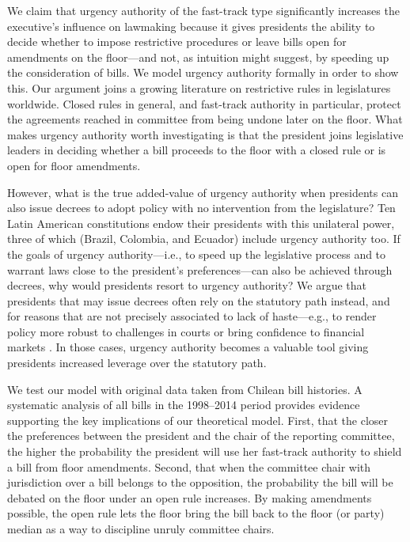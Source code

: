 \documentclass[letter,12pt]{article}
\let\footnote=\endnote
\begin{document}
We claim that urgency authority of the fast-track type significantly increases the executive's influence on lawmaking because it gives presidents the ability to decide whether to impose restrictive procedures or leave bills open for amendments on the floor---and not, as intuition might suggest, by speeding up the consideration of bills. We model urgency authority formally in order to show this. Our argument joins a growing literature on restrictive rules in legislatures worldwide.\footnote{E.g., \citet{dion.huber.1996,doring.restrictiveRules.2003,huber.1996b,krehbielRestrictiveRules1997,heller.2001,weingast.1992,schickler.richRules1997,cox.mccubbins.1997,amorim.cox.mccubbins.2003,calvo.2014argBook,sin.2014,denhartog.2004phd}.} Closed rules in general, and fast-track authority in particular, protect the agreements reached in committee from being undone later on the floor. What makes urgency authority worth investigating is that the president joins legislative leaders in deciding whether a bill proceeds to the floor with a closed rule or is open for floor amendments.

However, what is the true added-value of urgency authority when presidents can also issue decrees to adopt policy with no intervention from the legislature? Ten Latin American constitutions endow their presidents with this unilateral power, three of which (Brazil, Colombia, and Ecuador) include urgency authority too. If the goals of urgency authority---i.e., to speed up the legislative process and to warrant laws close to the president's preferences---can also be achieved through decrees, why would presidents resort to urgency authority? We argue that presidents that may issue decrees often rely on the statutory path instead, and for reasons that are not precisely associated to lack of haste---e.g., to render policy more robust to challenges in courts or bring confidence to financial markets \citep[cf.][]{palanza.2019}. In those cases, urgency authority becomes a valuable tool giving presidents increased leverage over the statutory path.  

We test our model with original data taken from Chilean bill histories. A systematic analysis of all bills in the 1998--2014 period provides evidence supporting the key implications of our theoretical model. First, that the closer the preferences between the president and the chair of the reporting committee, the higher the probability the president will use her fast-track authority to shield a bill from floor amendments. Second, that when the committee chair with jurisdiction over a bill belongs to the opposition, the probability the bill will be debated on the floor under an open rule increases. By making amendments possible, the open rule lets the floor bring the bill back to the floor (or party) median as a way to discipline unruly committee chairs.
\end{document}
